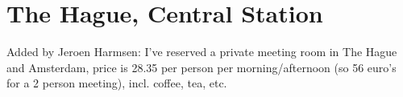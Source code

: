 \documentclass[11pt,a4paper,sans]{report} %
\begin{document}
\section{The Hague, Central Station}

Added by Jeroen Harmsen: I've reserved a private meeting room in The Hague and Amsterdam, price is 28.35 per person per morning/afternoon (so 56 euro's for a 2 person meeting), incl. coffee, tea, etc.

\end{document}
